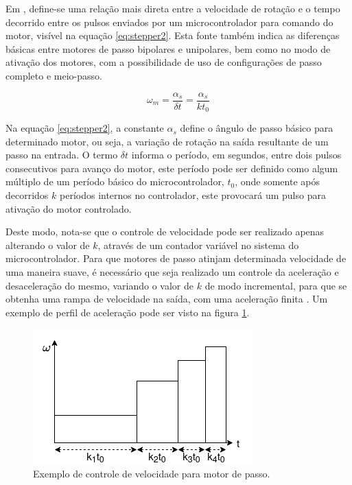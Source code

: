 Em \cite{atmel2006stepper}, define-se uma relação mais direta entre 
a velocidade de rotação e o tempo decorrido entre os pulsos enviados por um 
microcontrolador para comando do motor, visível na equação \ref{eq:stepper2}. 
Esta fonte também indica as diferenças básicas entre motores de passo
bipolares e unipolares, bem como no modo de ativação dos motores, com
a possibilidade de uso de configurações de passo completo e meio-passo.

\begin{equation}
    \label{eq:stepper2}
    \omega_m = \frac{\alpha_s}{\delta t} = \frac{\alpha_s}{kt_0}
\end{equation}

Na equação \ref{eq:stepper2}, a constante $\alpha_s$ define o ângulo de passo
básico para determinado motor, ou seja, a variação de rotação na saída 
resultante de um passo na entrada. O termo $\delta t$ informa o período,
em segundos, entre dois pulsos consecutivos para avanço do motor, 
este período pode ser definido como algum múltiplo de um período básico
do microcontrolador, $t_0$, onde somente após decorridos
$k$ períodos internos no controlador, este provocará um pulso para ativação
do motor controlado.

Deste modo, nota-se que o controle de velocidade pode ser realizado
apenas alterando o valor de $k$, através de um contador variável no 
sistema do microcontrolador. Para que motores de passo atinjam determinada
velocidade de uma maneira suave, é necessário que seja realizado um 
controle da aceleração e desaceleração do mesmo, 
variando o valor de $k$ de modo incremental, para que se obtenha uma
rampa de velocidade na saída, com uma aceleração finita \cite{atmel2006stepper}.
Um exemplo de perfil de aceleração pode ser visto na figura \ref{fig:stepperspeed}.

\begin{figure}[h]
    \caption{Exemplo de controle de velocidade para motor de passo.}    

    \begin{centering}
        \includegraphics[width=0.5\columnwidth]{images/fundamentos/StepperSpeed.png} 
    \par\end{centering}

    \label{fig:stepperspeed}
\end{figure}

